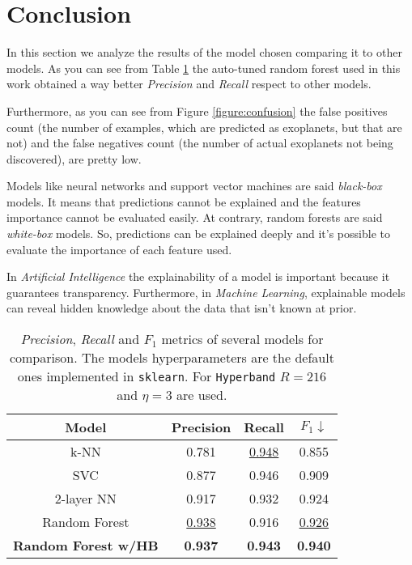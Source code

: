 \documentclass[11pt, a4paper]{article}
\begin{document}
\section{Conclusion}
  In this section we analyze the results of the model chosen comparing it to other models.
  As you can see from Table \ref{table:benchmark} the auto-tuned random forest used in this work obtained a way better \textit{Precision} and \textit{Recall} respect to other models.

  Furthermore, as you can see from Figure \ref{figure:confusion} the false positives count (the number of examples, which are predicted as exoplanets, but that are not) and the false negatives count (the number of actual exoplanets not being discovered), are pretty low.

  Models like neural networks and support vector machines are said \textit{black-box} models.
  It means that predictions cannot be explained and the features importance cannot be evaluated easily.
  At contrary, random forests are said \textit{white-box} models.
  So, predictions can be explained deeply and it's possible to evaluate the importance of each feature used.

  In \textit{Artificial Intelligence} the explainability of a model is important because it guarantees transparency.
  Furthermore, in \textit{Machine Learning}, explainable models can reveal hidden knowledge about the data that isn't known at prior.

  \begin{table}
    \centering
    \begin{tabular}{|c c c c|}
      \hline
      Model & Precision & Recall & $F_{1} \downarrow$  \\
      \hline\hline
      k-NN & 0.781 & \underline{0.948} & 0.855 \\
      \hline
      SVC & 0.877 & 0.946 & 0.909 \\
      \hline
      2-layer NN & 0.917 & 0.932 & 0.924 \\
      \hline
      Random Forest & \underline{0.938} & 0.916 & \underline{0.926} \\
      \hline
      \textbf{Random Forest w/HB} & \textbf{0.937} & \textbf{0.943} & \textbf{0.940} \\
      \hline
    \end{tabular}
    \caption{\textit{Precision}, \textit{Recall} and $F_{1}$ metrics of several models for comparison. The models hyperparameters are the default ones implemented in \texttt{sklearn}. For \texttt{Hyperband} $R=216$ and $\eta=3$ are used.}
    \label{table:benchmark}
  \end{table}
\end{document}
